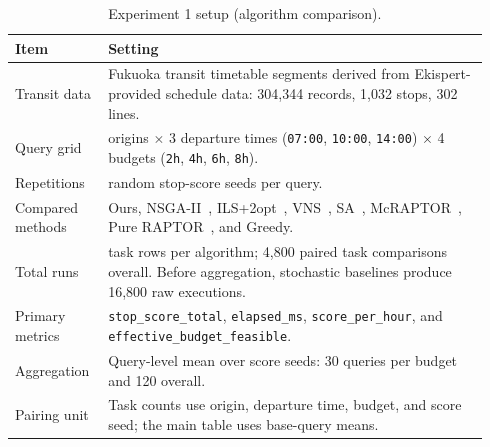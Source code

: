 \begin{table}[t]
    \centering
    \caption{Experiment 1 setup (algorithm comparison).}
    \label{tab:exp1_setup}
    \scriptsize
    \begin{tabular}{@{}>{\raggedright\arraybackslash}p{0.18\linewidth} >{\raggedright\arraybackslash}p{0.76\linewidth}@{}}
        \toprule
        Item             & Setting                                                                                                                                                                                                             \\
        \midrule
        Transit data     & Fukuoka transit timetable segments derived from Ekispert-provided schedule data: 304,344 records, 1,032 stops, 302 lines.                                                                                          \\
        Query grid       & 10 origins \(\times\) 3 departure times (\texttt{07:00}, \texttt{10:00}, \texttt{14:00}) \(\times\) 4 budgets (\texttt{2h}, \texttt{4h}, \texttt{6h}, \texttt{8h}).                                                 \\
        Repetitions      & 5 random stop-score seeds per query.                                                                                                                                                                                \\
        Compared methods & Ours, NSGA-II~\cite{deb2002nsga2}, ILS+2opt~\cite{lourenco2003ils}, VNS~\cite{mladenovic1997vns}, SA~\cite{kirkpatrick1983sa}, McRAPTOR~\cite{delling2015raptor}, Pure RAPTOR~\cite{delling2015raptor}, and Greedy. \\
        Total runs       & 600 task rows per algorithm; 4,800 paired task comparisons overall. Before aggregation, stochastic baselines produce 16,800 raw executions.                                                                         \\
        Primary metrics  & \texttt{stop\_score\_total}, \texttt{elapsed\_ms}, \texttt{score\_per\_hour}, and \texttt{effective\_budget\_feasible}.                                                                                             \\
        Aggregation      & Query-level mean over score seeds: 30 queries per budget and 120 overall.                                                                                                                                           \\
        Pairing unit     & Task counts use origin, departure time, budget, and score seed; the main table uses base-query means.                                                                                                               \\
        \bottomrule
    \end{tabular}
\end{table}

